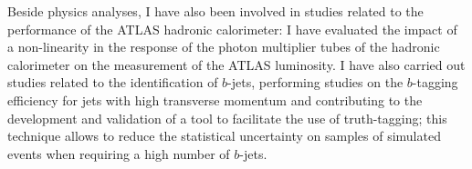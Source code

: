 \documentclass[11pt,a4paper]{article}
\begin{document}
Beside physics analyses, I have also been involved in studies related to the performance of the ATLAS hadronic calorimeter: 
I have evaluated the impact of a non-linearity in the response of the photon multiplier tubes of the 
hadronic calorimeter on the measurement of the ATLAS luminosity. 
I have also carried out studies related to the identification of $b$-jets, 
performing studies on the $b$-tagging efficiency for jets with high transverse momentum and contributing to 
the development and validation of a tool to facilitate the use of truth-tagging; this technique 
allows to reduce the statistical uncertainty on samples of simulated events when requiring a high number of $b$-jets. 


\end{document}
